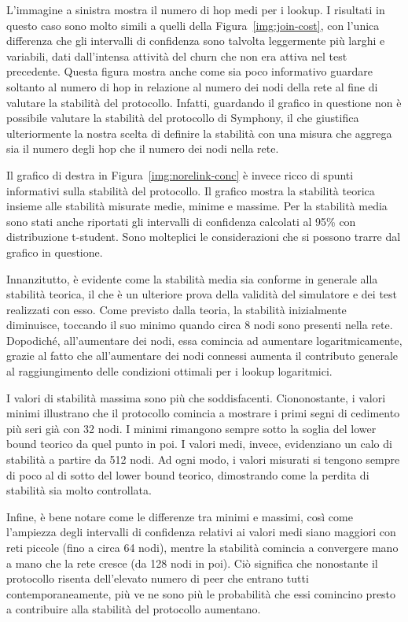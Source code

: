 \documentclass[prodmode,acmtap]{acmlarge}
\begin{document}
L'immagine a sinistra mostra il numero di hop medi per i lookup. I risultati in questo caso sono molto simili a quelli della Figura~\ref{img:join-cost}, con l'unica differenza che gli intervalli di confidenza sono talvolta leggermente più larghi e variabili, dati dall'intensa attività del churn che non era attiva nel test precedente. Questa figura mostra anche come sia poco informativo guardare soltanto al numero di hop in relazione al numero dei nodi della rete al fine di valutare la stabilità del protocollo. Infatti, guardando il grafico in questione non è possibile valutare la stabilità del protocollo di Symphony, il che giustifica ulteriormente la nostra scelta di definire la stabilità con una misura che aggrega sia il numero degli hop che il numero dei nodi nella rete.

Il grafico di destra in Figura~\ref{img:norelink-conc} è invece ricco di spunti informativi sulla stabilità del protocollo. Il grafico mostra la stabilità teorica insieme alle stabilità misurate medie, minime e massime. Per la stabilità media sono stati anche riportati gli intervalli di confidenza calcolati al 95\% con distribuzione t-student. Sono molteplici le considerazioni che si possono trarre dal grafico in questione.

Innanzitutto, è evidente come la stabilità media sia conforme in generale alla stabilità teorica, il che è un ulteriore prova della validità del simulatore e dei test realizzati con esso. Come previsto dalla teoria, la stabilità inizialmente diminuisce, toccando il suo minimo quando circa 8 nodi sono presenti nella rete. Dopodiché, all'aumentare dei nodi, essa comincia ad aumentare logaritmicamente, grazie al fatto che all'aumentare dei nodi connessi aumenta il contributo generale al raggiungimento delle condizioni ottimali per i lookup logaritmici.

I valori di stabilità massima sono più che soddisfacenti. Ciononostante, i valori minimi illustrano che il protocollo comincia a mostrare i primi segni di cedimento più seri già con 32 nodi. I minimi rimangono sempre sotto la soglia del lower bound teorico da quel punto in poi. I valori medi, invece, evidenziano un calo di stabilità a partire da 512 nodi. Ad ogni modo, i valori misurati si tengono sempre di poco al di sotto del lower bound teorico, dimostrando come la perdita di stabilità sia molto controllata.

Infine, è bene notare come le differenze tra minimi e massimi, così come l'ampiezza degli intervalli di confidenza relativi ai valori medi siano maggiori con reti piccole (fino a circa 64 nodi), mentre la stabilità comincia a convergere mano a mano che la rete cresce (da 128 nodi in poi). Ciò significa che nonostante il protocollo risenta dell'elevato numero di peer che entrano tutti contemporaneamente, più ve ne sono più le probabilità che essi comincino presto a contribuire alla stabilità del protocollo aumentano.
\end{document}
